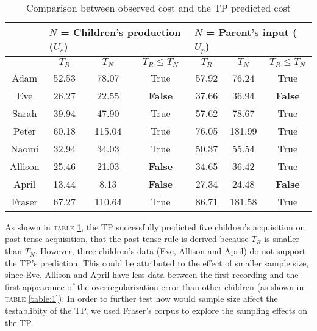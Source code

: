 \begin{table}[htb]
\centering
\caption{Comparison between observed cost and the TP predicted cost}
\label{table:TRTNTR<TN}
\begin{tabular}{cccc|ccc}
\toprule
 & \multicolumn{3}{l}{$N$ = Children's production ($U_c$)} & \multicolumn{3}{l}{$N$ = Parent's input ($U_p$)} \\
 \hline
 & $T_R$ & $T_N$ & $T_R \leq T_N$ & $T_R$ & $T_N$ & $T_R \leq T_N$ \\
Adam & 52.53 & 78.07 & True & 57.92 & 76.24 & True \\
Eve & 26.27 & 22.55 & \textbf{False} & 37.66 & 36.94 & \textbf{False} \\
Sarah & 39.94 & 47.90 & True & 57.62 & 78.67 & True \\
Peter & 60.18 & 115.04 & True & 76.05 & 181.99 & True \\
Naomi & 32.94 & 34.03 & True & 50.37 & 55.54 & True \\
Allison & 25.46 & 21.03 & \textbf{False} & 34.65 & 36.42 & True \\
April & 13.44 & 8.13 & \textbf{False} & 27.34 & 24.48 & \textbf{False} \\
Fraser & 67.27 & 110.64 & True & 86.71 & 181.58 & True\\
\bottomrule
\end{tabular}
\end{table}

As shown in \textsc{table} \ref{table:TRTNTR<TN}, the TP successfully predicted five children's acquisition on past tense acquisition, that the past tense rule is derived because $T_R$ is smaller than $T_N$. However, three children's data (Eve, Allison and April) do not support the TP's prediction. This could be attributed to the effect of smaller sample size, since Eve, Allison and April have less data between the first recording and the first appearance of the overregularization error than other children (as shown in \textsc{table} \ref{table:1}). In order to further test how would sample size affect the testablibity of the TP, we used Fraser's corpus to explore the sampling effects on the TP.  


